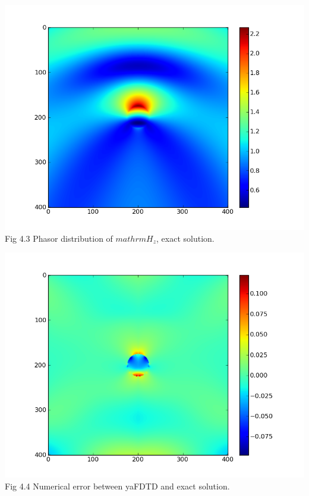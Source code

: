 \documentclass[openany]{book}
\begin{document}
\begin{center}
\includegraphics[scale=0.8]{images/phasor-exam-exact.png}\\
Fig 4.3
Phasor distribution of $mathrm{H_z}$, exact solution.
\end{center}
\begin{center}
\includegraphics[scale=0.8]{images/errors.png}\\
Fig 4.4
Numerical error between yaFDTD and exact solution.
\end{center}
\end{document}
